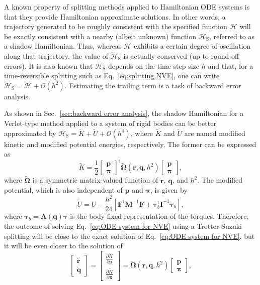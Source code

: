 \documentclass[journal=jctcce,manuscript=article,layout=twocolumn]{achemso}
\newcommand{\mt}[1]{\boldsymbol{\mathbf{#1}}}   %
\newcommand{\vt}[1]{\boldsymbol{\mathbf{#1}}}   %
\newcommand{\tr}[1]{#1^\text{t}}                %
\newcommand{\diff}[2]{\frac{\partial #1}{\partial #2}} %
\newcommand{\Ham}[1]{{\mathcal H}_\text{#1}}    %
\newcommand{\timestep}{h}
\newcommand{\modified}[1]{\widetilde{#1}}
\begin{document}
A known property of splitting methods applied to Hamiltonian ODE systems is that they provide Hamiltonian approximate solutions. In other words, a trajectory generated to be roughly consistent with the specified function $\Ham{}$ will be exactly consistent with a nearby (albeit unknown) function $\Ham{S}$, referred to as a shadow Hamiltonian. Thus, whereas $\Ham{}$ exhibits a certain degree of oscillation along that trajectory, the value of $\Ham{S}$ is actually conserved (up to round-off errors). It is also known that $\Ham{S}$ depends on the time step size $\timestep$ and that, for a time-reversible splitting such as Eq.~\eqref{eq:splitting NVE}, one can write $\Ham{S} = \Ham{} + \mathcal{O}(\timestep^2)$. Estimating the trailing term is a task of backward error analysis.

As shown in Sec.~\ref{sec:backward error analysis}, the shadow Hamiltonian for a Verlet-type method applied to a system of rigid bodies can be better approximated by $\Ham{S} = \modified K + \modified U + \mathcal{O}(h^4)$, where $\modified K$ and $\modified U$ are named modified kinetic and modified potential energies, respectively. The former can be expressed as
\begin{equation}
\label{eq:shadow kinetic energy}
\modified K = \frac{1}{2} \tr{ \left[\begin{array}{c} \vt p \\ \vt \pi \end{array}\right]} \modified{\mathbf \Omega}(\vt r, \vt q, \timestep^2) \left[\begin{array}{c} \vt p \\ \vt \pi \end{array}\right],
\end{equation}
where $\modified{\mathbf \Omega}$ is a symmetric matrix-valued function of $\vt r$, $\vt q$, and $\timestep^2$. The modified potential, which is also independent of $\vt p$ and $\vt \pi$, is given by
\begin{equation}
\label{eq:shadow potential energy}
\modified U = U - \frac{\timestep^2}{24} \left[ \tr{\vt F} {\mt M}^{-1} {\vt F} + \tr{\vt \tau}_b {\mt I}^{-1} {\vt \tau}_b \right],
\end{equation}
where ${\vt \tau}_b = {\mt A}(\vt q) {\vt \tau}$ is the body-fixed representation of the torques. Therefore, the outcome of solving Eq.~\eqref{eq:ODE system for NVE} using a Trotter-Suzuki splitting will be close to the exact solution of Eq.~\eqref{eq:ODE system for NVE}, but it will be even closer to the solution of
\begin{equation}
\label{eq:shadow ODE system}
\left[\begin{array}{c} \dot{\vt r} \\ \dot{\vt q} \end{array}\right] =
\left[\begin{array}{c} \diff{\modified K}{\vt p} \\ \diff{\modified K}{\vt \pi} \end{array}\right] =
\modified{\mathbf \Omega}(\vt r, \vt q, \timestep^2) \left[\begin{array}{c} \vt p \\ \vt \pi \end{array}\right],
\end{equation}
\end{document}
